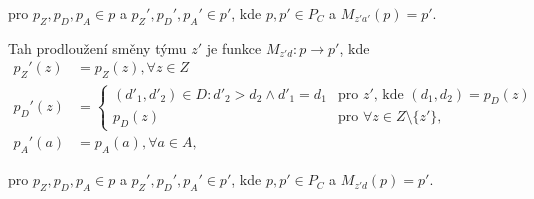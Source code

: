 \begin{definice}[Tah]
  pro $p_Z, p_D, p_A \in p$ a $p_Z', p_D', p_A' \in p'$, kde $p, p' \in P_C$ a $M_{z'a'}(p) = p'$.

  Tah prodloužení směny týmu $z'$ je funkce $M_{z'd} : p \rightarrow p'$, kde
  \begin{align*}
    p_Z'(z) &= p_Z(z), \forall z \in Z \\
    p_D'(z) &=
      \begin{cases}
        (d'_1, d'_2) \in D \colon d'_2 > d_2 \land d'_1 = d_1  & \text{pro $z'$, kde $(d_1, d_2) = p_{D}(z)$} \\
        p_D(z) & \text{pro $\forall z \in Z \setminus \{ z' \}$},
      \end{cases}
      \\
    p_A'(a) &= p_A(a), \forall a \in A,
  \end{align*}

  pro $p_Z, p_D, p_A \in p$ a $p_Z', p_D', p_A' \in p'$, kde $p, p' \in P_C$ a $M_{z'd}(p) = p'$.

\end{definice}

%
%









